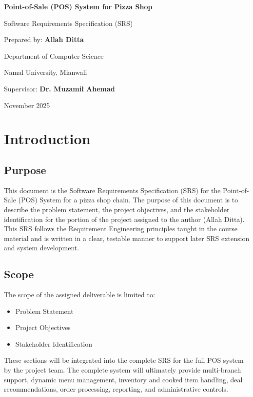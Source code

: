 \documentclass[12pt,a4paper]{article}
\begin{document}
\begin{titlepage}
    \centering
    \vspace*{2cm}
    {\LARGE\textbf{Point-of-Sale (POS) System for Pizza Shop} \par}
    \vspace{1.5cm}
    {\Large Software Requirements Specification (SRS) \par}
    \vspace{2cm}
    {\large Prepared by: \textbf{Allah Ditta} \par}
    {\large Department of Computer Science \par}
    {\large Namal University, Mianwali \par}
    \vspace{0.5cm}
    {\large Supervisor: \textbf{Dr. Muzamil Ahemad} \par}
    \vfill
    {\large November 2025 \par}
\end{titlepage}

\tableofcontents
\newpage

\section{Introduction}
\subsection{Purpose}
This document is the Software Requirements Specification (SRS) for the Point-of-Sale (POS) System for a pizza shop chain. The purpose of this document is to describe the problem statement, the project objectives, and the stakeholder identification for the portion of the project assigned to the author (Allah Ditta). This SRS follows the Requirement Engineering principles taught in the course material and is written in a clear, testable manner to support later SRS extension and system development.

\subsection{Scope}
The scope of the assigned deliverable is limited to:
\begin{itemize}
    \item Problem Statement
    \item Project Objectives
    \item Stakeholder Identification
\end{itemize}
These sections will be integrated into the complete SRS for the full POS system by the project team. The complete system will ultimately provide multi-branch support, dynamic menu management, inventory and cooked item handling, deal recommendations, order processing, reporting, and administrative controls.
\end{document}
